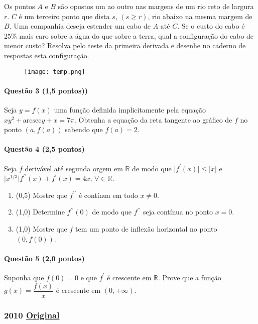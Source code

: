 \documentclass[12pt,a4paper]{article}
\newcommand{\R}{\mathbb{R}}
\newcommand{\modu}[1]{\vert #1 \vert}
\newcommand{\original}[1]{\tiny \href{#1}{Original} \normalsize}
\begin{document}
Os pontos $A$ e $B$ são opostos um ao outro nas margens de um rio reto de largura $r$. $C$ é um terceiro ponto que dista $s$, $(s \ge r)$, rio abaixo na mesma margem de $B$. Uma companhia deseja estender um cabo de $A$ até $C$. Se o custo do cabo é $25\%$ mais caro sobre a água do que sobre a terra, qual a configuração do cabo de menor custo? Resolva pelo teste da primeira derivada e desenhe no caderno de respostas esta configuração.

\begin{figure}[h]
\centering
\texttt{[image: temp.png]}
\end{figure}

\paragraph{Questão 3 (1,5 pontos))}

Seja $y = f(x)$ uma função definida implicitamente pela equação $xy^2 + \mathrm{arcsec } y + x = 7\pi$. Obtenha a equação da reta tangente ao gráfico de $f$ no ponto $(a, f(a))$ sabendo que $f(a) = 2$.

\paragraph{Questão 4 (2,5 pontos)}

Seja $f$ derivável até segunda orgem em $\R$ de modo que $\modu{f^{\prime}(x)} \le \modu{x}$ e $\modu{x^{1/3}}f^{\prime \prime}(x) + f^{\prime}(x) = 4x,\, \forall \in \R$.

\begin{enumerate}[label=(\alph*)]
\item (0,5) Mostre que $f^{\prime\prime}$ é contínua em todo $x\neq 0$.
\item (1,0) Determine $f^{\prime\prime}(0)$ de modo que $f^{\prime\prime}$ seja contínua no ponto $x=0$.
\item (1,0) Mostre que $f$ tem um ponto de inflexão horizontal no ponto $(0, f(0))$.
\end{enumerate}

\paragraph{Questão 5 (2,0 pontos)}

Suponha que $f(0) = 0$ e que $f^{\prime}$ é crescente em $\R$. Prove que a função $g(x) = \dfrac{f(x)}{x}$ é crescente em $(0, +\infty)$.


\newpage
\subsubsection{2010 \original{https://drive.google.com/open?id=1Nbrgno_q7fJQ-hH_qV9SnLmD_8t9RIOx}}
\end{document}
